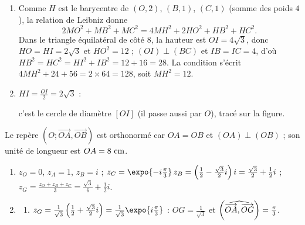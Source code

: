 \begin{description}
\begin{enumerate}
\begin{enumerate}
				$2\overrightarrow{HO} + \overrightarrow{HB} + \overrightarrow{HC} = \vec{0}$ et $\overrightarrow{HB} + \overrightarrow{HC} = 2\overrightarrow{HI}$, donc
				$2\overrightarrow{HO} + 2\overrightarrow{HI} = \vec{0}$ : \par\noindent{}
			\item {}
				Comme $H$ est le barycentre de $(O,2)$, $(B,1)$, $(C,1)$ (somme des poids $4$), la relation de Leibniz donne
				\[
					2MO^2 + MB^2 + MC^2 = 4MH^2 + 2HO^2 + HB^2 + HC^2 .
				\]
				Dans le triangle équilatéral de côté $8$, la hauteur est $OI = 4\sqrt{3}$, donc $HO = HI = 2\sqrt{3}$ et $HO^2 = 12$ ;
				$(OI) \perp (BC)$ et $IB = IC = 4$, d'où $HB^2 = HC^2 = HI^2 + IB^2 = 12 + 16 = 28$.
				La condition s'écrit $4MH^2 + 24 + 56 = 2 \times 64 = 128$, soit $MH^2 = 12$.
				\par\noindent{}
			\item {}
				$HI = \frac{OI}{2} = 2\sqrt{3}$ : \par\noindent{} c'est le cercle de diamètre $[OI]$ (il passe aussi par $O$), tracé sur la figure.
		\end{enumerate}
	\end{enumerate}
	\item[Partie B]
	Le repère $(O;\overrightarrow{OA},\overrightarrow{OB})$ est orthonormé car $OA = OB$ et $(OA) \perp (OB)$ ; son unité de longueur est $OA = 8~\mathrm{cm}$.
	\begin{enumerate}
		\item {}
			$z_O = 0$, $z_A = 1$, $z_B = i$ ; $z_C = \expo{-i\frac{\pi}{3}}\, z_B = \left(\frac{1}{2} - \frac{\sqrt{3}}{2} i\right) i = \frac{\sqrt{3}}{2} + \frac{1}{2} i$ ;
			$z_G = \frac{z_O + z_B + z_C}{3} = \frac{\sqrt{3}}{6} + \frac{1}{2} i$.
			\par\noindent{}
		\item
		\begin{enumerate}
			\item {}
				$z_G = \frac{1}{\sqrt{3}}\left(\frac{1}{2} + \frac{\sqrt{3}}{2} i\right) = \frac{1}{\sqrt{3}}\expo{i\frac{\pi}{3}}$ :
				$OG = \frac{1}{\sqrt{3}}$ et $\left( \widehat{ \overrightarrow{OA} , \overrightarrow{OG} } \right) = \frac{\pi}{3}$.
				\par\noindent{}

\end{enumerate}
\end{enumerate}
\end{description}
